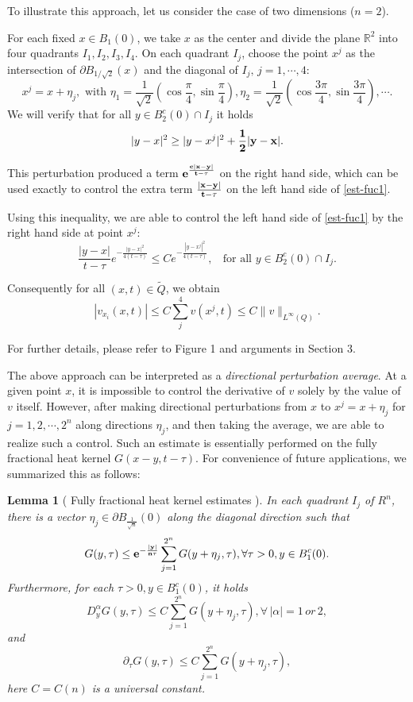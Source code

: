 \documentclass[12pt]{article}
\newtheorem{mlem}{Lemma}
\theoremstyle{remark}
\numberwithin{equation}{section}
\newcommand{\R}{\mathbb{R}}
\begin{document}
To illustrate this approach, let us consider the case of two dimensions ($n=2$).


For each fixed  $x\in B_1(0)$, we take $x$ as the center and divide the plane $\R^2$ into four quadrants $I_1, I_2, I_3, I_4.$
On each quadrant $I_j$, choose the point $x^j$ as the intersection of $\partial B_{1/\sqrt{2}}(x)$ and the diagonal of $I_j, \,  j=1, \cdots, 4$:
$$ x^j = x + \eta_j, \mbox{ with } \eta_1 = \frac{1}{\sqrt{2}}(\cos \frac{\pi}{4}, \sin \frac{\pi}{4}), \eta_2 = \frac{1}{\sqrt{2}} (\cos \frac{3\pi}{4}, \sin \frac{3\pi}{4}), \cdots.$$
We will verify that for all $y\in B_2^c(0)\cap I_j$ it holds
$$|y-x|^2 \geq |y-x^j|^2 + {\bf \frac{1}{2} |y-x|}.$$

This perturbation produced a term ${\bf  e^{\frac{c|x-y|}{t-\tau}}}$ on the right hand side, which can be used exactly to control the extra term ${\bf \frac{|x-y|}{t-\tau}}$ on the left hand side  of \eqref{est-fuc1}.

 Using this inequality, we are able to control the left hand side of \eqref{est-fuc1} by the right hand side at point $x^j$:
 $$
\frac{|y-x|}{t-\tau} e^{-\frac{|y-x|^2}{4(t-\tau)}} \leq C e^{-\frac{|y-x^j|^2}{4(t-\tau)}}, \;\; \mbox{ for all }  y \in B_2^c (0) \cap I_j.
$$

Consequently
for all $(x, t) \in \tilde{Q}$, we obtain
$$|v_{x_i} (x, t)| \leq C\sum_j^4  v(x^j,t) \leq C \|v\|_{L^\infty (Q)}. $$

For further details, please refer to Figure 1 and arguments in Section 3.

The above approach can be interpreted as a {\em directional perturbation average}. At a given point $x$, it is impossible to control the derivative of $v$ solely by the value of $v$ itself. However, after making directional perturbations from $x$ to $x^j = x + \eta_j$ for $ j=1,2, \cdots, 2^n$ along directions $\eta_j$, and then taking the average, we are able to realize such a control. Such an estimate is essentially performed on the fully fractional heat kernel $G(x-y, t-\tau)$. For convenience of future applications, we summarized this as
follows:
\begin{mlem}[ Fully  fractional heat kernel estimates ]\label{key0} In each quadrant $I_j$ of $R^n$, there is a vector $\eta_j\in\partial B_{\frac{1}{\sqrt{n}}}(0)$ along the diagonal direction such that
\begin{equation}\label{key1} G(y,\tau)\leq {\bf{e^{-\frac{|y|}{n\tau}}}}\sum\limits_{j=1}^{2^n}G(y+{\eta}_j,\tau),  \forall \tau>0, y\in B_1^c(0).\end{equation}
Furthermore,   for each $\tau>0, y\in B_1^c(0)$, it holds
\begin{equation} D_y^\alpha  G(y,\tau)\leq C\sum\limits_{j=1}^{2^n}G(y+{\eta}_j,\tau), \forall \, |\alpha|=1 \, or \, 2,\end{equation}
and
 \begin{equation}  \partial_\tau G(y,\tau)\leq C\sum\limits_{j=1}^{2^n}G(y+{\eta}_j,\tau),\end{equation}
here $C=C(n)$ is a universal constant.
\end{mlem}
\end{document}
